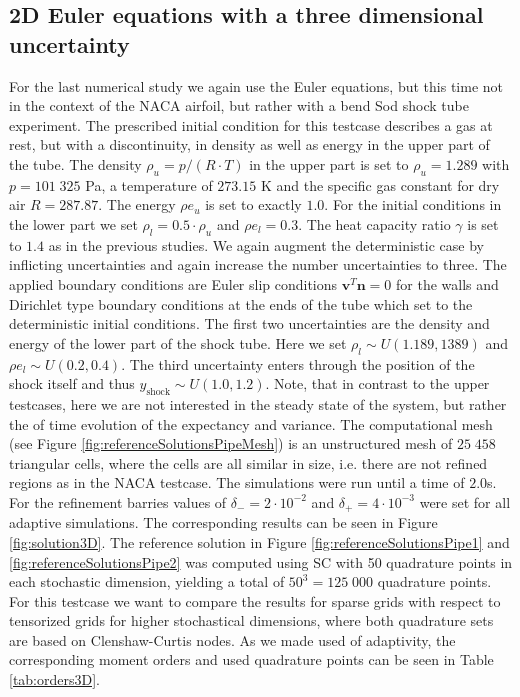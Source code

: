 \subsection{2D Euler equations with a three dimensional uncertainty}
For the last numerical study we again use the Euler equations, but this time not in the context of the NACA airfoil, but rather with a bend Sod shock tube experiment. The prescribed initial condition for this testcase describes a gas at rest, but with a discontinuity, in density as well as energy in the upper part of the tube. The density $\rho_u = p/(R \cdot T)$ in the upper part is set to $\rho_u = 1.289$ with $p = 101\;325$ Pa, a temperature of $273.15$ K and the specific gas constant for dry air $R=287.87$. The energy $\rho e_u$ is set to exactly $1.0$. For the initial conditions in the lower part we set $\rho_l = 0.5 \cdot \rho_u$ and $\rho e_l = 0.3$. The heat capacity ratio $\gamma$ is set to $1.4$ as in the previous studies. We again augment the deterministic case by inflicting uncertainties and again increase the number uncertainties to three. The applied boundary conditions are Euler slip conditions $\bm{v}^T\bm{n}=0$ for the walls and Dirichlet type boundary conditions at the ends of the tube which set to the deterministic initial conditions. The first two uncertainties are the density and energy of the lower part of the shock tube. Here we set $\rho_l \sim U(1.189,1389)$ and $\rho e_l \sim U(0.2,0.4)$. The third uncertainty enters through the position of the shock itself and thus $y_\text{shock} \sim U(1.0, 1.2)$. Note, that in contrast to the upper testcases, here we are not interested in the steady state of the system, but rather the of time evolution of the expectancy and variance. The computational mesh (see Figure \ref{fig:referenceSolutionsPipeMesh}) is an unstructured mesh of $25\;458$ triangular cells, where the cells are all similar in size, i.e. there are not refined regions as in the NACA testcase. The simulations were run until a time of $2.0$s. For the refinement barries values of $\delta_{-} = 2\cdot 10^{-2}$ and $\delta_{+} = 4\cdot 10^{-3}$ were set for all adaptive simulations. The corresponding results can be seen in Figure \ref{fig:solution3D}. The reference solution in Figure \ref{fig:referenceSolutionsPipe1} and \ref{fig:referenceSolutionsPipe2} was computed using SC with 50 quadrature points in each stochastic dimension, yielding a total of $50^3=125\;000$ quadrature points.\\
For this testcase we want to compare the results for sparse grids with respect to tensorized grids for higher stochastical dimensions, where both quadrature sets are based on Clenshaw-Curtis nodes. As we made used of adaptivity, the corresponding moment orders and used quadrature points can be seen in Table \ref{tab:orders3D}.
